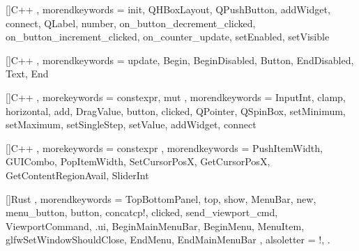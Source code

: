 \usepackage{listings}


[]{C++}{
    , morendkeywords = {init, QHBoxLayout, QPushButton, addWidget, connect, QLabel, number, on_button_decrement_clicked, on_button_increment_clicked, on_counter_update, setEnabled, setVisible}
}

[]{C++}{
    , morendkeywords = {update, Begin, BeginDisabled, Button, EndDisabled, Text, End}
}

[]{C++}{
    , morekeywords = {constexpr, mut}
    , morendkeywords = {
            InputInt, clamp,
            horizontal, add, DragValue, button, clicked,
            QPointer, QSpinBox, setMinimum, setMaximum, setSingleStep, setValue, addWidget, connect
        }
}

[]{C++}{
    , morekeywords = {constexpr}    
    , morendkeywords = {PushItemWidth, GUICombo, PopItemWidth, SetCursorPosX, GetCursorPosX, GetContentRegionAvail, SliderInt}
}


[]{Rust}{ 
    , morendkeywords = {
        TopBottomPanel, top, show, MenuBar, new, menu_button, button, concatcp!, clicked, send_viewport_cmd, ViewportCommand, .ui,
        BeginMainMenuBar, BeginMenu, MenuItem, glfwSetWindowShouldClose, EndMenu, EndMainMenuBar
    }
    , alsoletter = {!, .}
}

